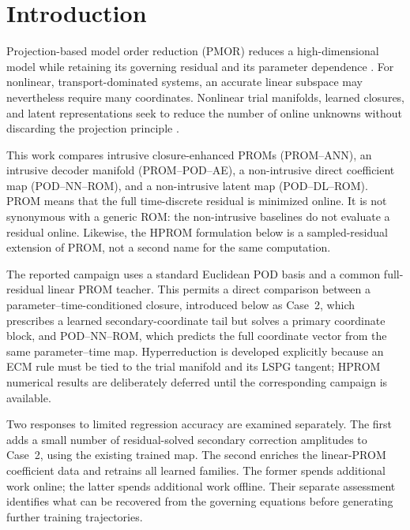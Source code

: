 \documentclass[11pt]{article}
\begin{document}
\vspace{-0.8em}

\section{Introduction}
\label{sec:introduction}
Projection-based model order reduction (PMOR) reduces a high-dimensional model
while retaining its governing residual and its parameter dependence
\cite{antoulas2005approximation,quarteroni2014reduced}.  For nonlinear,
transport-dominated systems, an accurate linear subspace may nevertheless
require many coordinates.  Nonlinear trial manifolds, learned closures, and
latent representations seek to reduce the number of online unknowns without
discarding the projection principle
\cite{barnett2023neural,cohen2023nonlinear,aghili2026nonlinear}.

This work compares intrusive closure-enhanced PROMs (PROM--ANN), an intrusive
decoder manifold (PROM--POD--AE), a non-intrusive direct coefficient map
(POD--NN--ROM), and a non-intrusive latent map (POD--DL--ROM).  PROM means
that the full time-discrete residual is minimized online.  It is not
synonymous with a generic ROM: the non-intrusive baselines do not evaluate a
residual online.  Likewise, the HPROM formulation below is a sampled-residual
extension of PROM, not a second name for the same computation.

The reported campaign uses a standard Euclidean POD basis and a common
full-residual linear PROM teacher.  This permits a direct comparison between
a parameter--time-conditioned closure, introduced below as Case~2, which
prescribes a learned secondary-coordinate tail but solves a primary
coordinate block, and POD--NN--ROM, which predicts the full coordinate
vector from the same parameter--time map.  Hyperreduction is developed
explicitly because an ECM rule must be tied to the trial manifold and its LSPG
tangent; HPROM numerical results are deliberately deferred until the
corresponding campaign is available.

Two responses to limited regression accuracy are examined separately.  The
first adds a small number of residual-solved secondary correction amplitudes
to Case~2, using the existing trained map.  The second enriches the
linear-PROM coefficient data and retrains all learned families.  The former
spends additional work online; the latter spends additional work offline.
Their separate assessment identifies what can be recovered from the
governing equations before generating further training trajectories.
\end{document}
